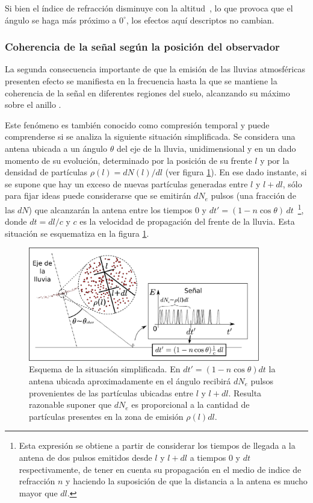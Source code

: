 	Si bien el \'indice de refracci\'on disminuye con la altitud~\cite{zhairezAir}, lo que provoca que el \'angulo \cher{} se haga m\'as pr\'oximo a $0^\circ$, los efectos aqu\'i descriptos no cambian.  
	
	\subsubsection{Coherencia de la se\~nal seg\'un la posici\'on del observador}
	
	La segunda consecuencia importante de que la emisi\'on de las lluvias atmosf\'ericas presenten efecto \cher{} se manifiesta en la frecuencia hasta la que se mantiene la coherencia de la se\~nal en diferentes regiones del suelo, alcanzando su m\'aximo sobre el anillo \cher{}.
	
	Este fen\'omeno es tambi\'en conocido como compresi\'on temporal y puede comprenderse si se analiza la siguiente situaci\'on simplificada.
	Se considera una antena ubicada a un \'angulo $\theta$ del eje de la lluvia, unidimensional y en un dado momento de su evoluci\'on, determinado por la posici\'on de su frente $l$ y por la densidad de part\'iculas $\rho(l)=dN(l)/dl$ (ver figura \ref{fig:coherencia_1}).
	En ese dado instante, si se supone que hay un exceso de nuevas part\'iculas generadas entre $l$ y $l+dl$, s\'olo para fijar ideas puede considerarse que se emitir\'an $dN_e$ pulsos  (una fracci\'on de las $dN$) que alcanzar\'an la antena entre los tiempos $0$ y $dt'=(1-n\cos\theta)\,dt$~\footnote{Esta expresi\'on se obtiene a partir de considerar los tiempos de llegada a la antena de dos pulsos emitidos desde $l$ y $l+dl$ a tiempos $0$ y $dt$ respectivamente, de tener en cuenta su propagaci\'on en el medio de indice de refracci\'on $n$ y haciendo la suposici\'on de que la distancia a la antena es mucho mayor que $dl$.}, donde $dt=dl/c$ y $c$ es la velocidad de propagaci\'on del frente de la lluvia.
	Esta situaci\'on se esquematiza en la figura \ref{fig:coherencia_1}.
	\begin{figure}[ht!]
		\centering
		\includegraphics[width=0.9\textwidth]{fig/EASRadio/coherencia_2}
		\caption{\label{fig:coherencia_1} Esquema de la situaci\'on simplificada. En $dt'=(1-n\cos\theta)dt$ la antena ubicada aproximadamente en el \'angulo \cher{} recibir\'a $dN_e$ pulsos provenientes de las part\'iculas ubicadas entre $l$ y $l+dl$. Resulta razonable suponer que $dN_e$ es proporcional a la cantidad de part\'iculas presentes en la zona de emisi\'on $\rho(l)dl$.}
	\end{figure}
	
